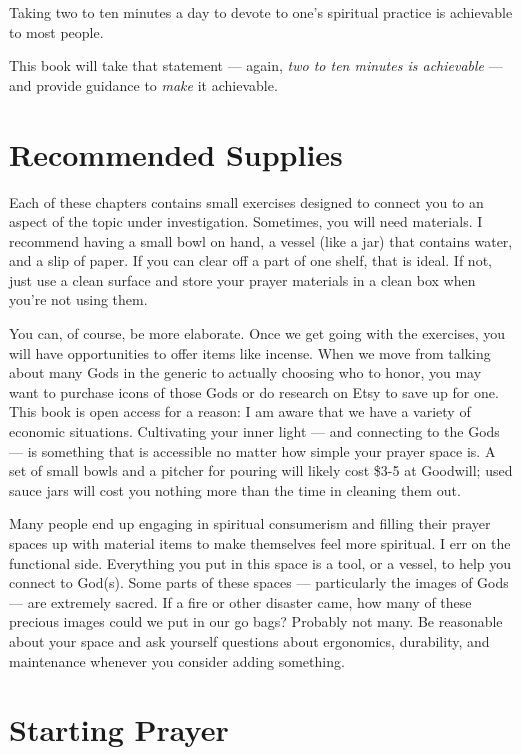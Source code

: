 \documentclass[
]{book}
\begin{document}
Taking two to ten minutes a day to devote to one's spiritual practice is achievable to most people.

This book will take that statement --- again, \emph{two to ten minutes is achievable} --- and provide guidance to \emph{make} it achievable.

\hypertarget{recommended-supplies}{%
\section{Recommended Supplies}\label{recommended-supplies}}

Each of these chapters contains small exercises designed to connect you to an aspect of the topic under investigation. Sometimes, you will need materials. I recommend having a small bowl on hand, a vessel (like a jar) that contains water, and a slip of paper. If you can clear off a part of one shelf, that is ideal. If not, just use a clean surface and store your prayer materials in a clean box when you're not using them.

You can, of course, be more elaborate. Once we get going with the exercises, you will have opportunities to offer items like incense. When we move from talking about many Gods in the generic to actually choosing who to honor, you may want to purchase icons of those Gods or do research on Etsy to save up for one. This book is open access for a reason: I am aware that we have a variety of economic situations. Cultivating your inner light --- and connecting to the Gods --- is something that is accessible no matter how simple your prayer space is. A set of small bowls and a pitcher for pouring will likely cost \$3-5 at Goodwill; used sauce jars will cost you nothing more than the time in cleaning them out.

Many people end up engaging in spiritual consumerism and filling their prayer spaces up with material items to make themselves feel more spiritual. I err on the functional side. Everything you put in this space is a tool, or a vessel, to help you connect to God(s). Some parts of these spaces --- particularly the images of Gods --- are extremely sacred. If a fire or other disaster came, how many of these precious images could we put in our go bags? Probably not many. Be reasonable about your space and ask yourself questions about ergonomics, durability, and maintenance whenever you consider adding something.

\hypertarget{starting-prayer}{%
\section{Starting Prayer}\label{starting-prayer}}
\end{document}
